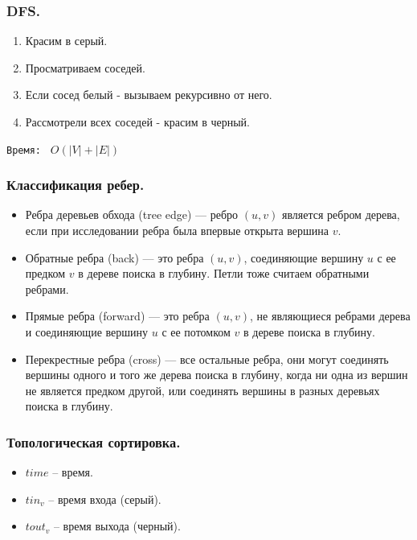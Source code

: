 \documentclass[a4paper,14pt]{article}
\begin{document}
    \subsubsection*{DFS.}
    \begin{enumerate}
        \item Красим в серый.
        \item Просматриваем соседей.
        \item Если сосед белый - вызываем рекурсивно от него.
        \item Рассмотрели всех соседей - красим в черный.
    \end{enumerate}
    \texttt{Время: } $O(|V|+|E|)$

    \subsubsection*{Классификация ребер.}
    \begin{itemize}
        \item Ребра деревьев обхода (tree edge) — ребро $(u,v)$ является
        ребром дерева, если при исследовании ребра была впервые
        открыта вершина $v$.
        \item Обратные ребра (back) — это ребра $(u,v)$, соединяющие
        вершину $u$ с ее предком $v$ в дереве поиска в глубину. Петли
        тоже считаем обратными ребрами.
        \item Прямые ребра (forward) — это ребра $(u,v)$, не являющиеся
        ребрами дерева и соединяющие вершину $u$ с ее потомком $v$ в
        дереве поиска в глубину.
        \item Перекрестные ребра (cross) — все остальные ребра, они могут
        соединять вершины одного и того же дерева поиска в глубину,
        когда ни одна из вершин не является предком другой, или
        соединять вершины в разных деревьях поиска в глубину.
    \end{itemize}
    \subsubsection*{Топологическая сортировка.}
    \begin{itemize}
        \item $time$ -- время.
        \item $tin_v$ -- время входа (серый).
        \item $tout_v$ -- время выхода (черный).
    \end{itemize}
\end{document}
